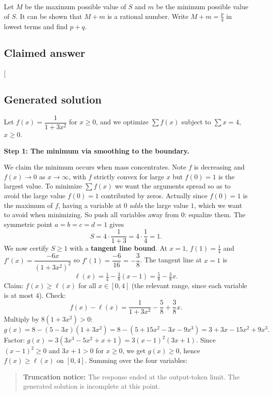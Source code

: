 \documentclass[
  11pt,
  letterpaper,
]{article}
\begin{document}
Let \(M\) be the maximum possible value of \(S\) and \(m\) be the
minimum possible value of \(S\). It can be shown that \(M+m\) is a
rational number. Write \(M+m=\frac{p}{q}\) in lowest terms and find
\(p+q\).

\subsection{Claimed answer}\label{claimed-answer-18}

{[}\boxed{34}{]}

\subsection{Generated solution}\label{generated-solution-18}

Let \(f(x)=\dfrac{1}{1+3x^2}\) for \(x\ge 0\), and we optimize
\(\sum f(x)\) subject to \(\sum x=4\), \(x\ge0\).

\textbf{Step 1: The minimum via smoothing to the boundary.}

We claim the minimum occurs when mass concentrates. Note \(f\) is
decreasing and \(f(x)\to 0\) as \(x\to\infty\), with \(f\) strictly
convex for large \(x\) but \(f(0)=1\) is the largest value. To minimize
\(\sum f(x)\) we want the arguments spread so as to avoid the large
value \(f(0)=1\) contributed by zeros. Actually since \(f(0)=1\) is the
maximum of \(f\), having a variable at \(0\) \emph{adds} the large value
\(1\), which we want to avoid when minimizing. So push all variables
away from \(0\): equalize them. The symmetric point \(a=b=c=d=1\) gives
\[
S=4\cdot\frac{1}{1+3}=4\cdot\frac14=1.
\] We now certify \(S\ge 1\) with a \textbf{tangent line bound}. At
\(x=1\), \(f(1)=\tfrac14\) and \(f'(x)=\dfrac{-6x}{(1+3x^2)^2}\) so
\(f'(1)=\dfrac{-6}{16}=-\dfrac38\). The tangent line at \(x=1\) is \[
\ell(x)=\tfrac14-\tfrac38(x-1)=\tfrac58-\tfrac38 x.
\] Claim: \(f(x)\ge \ell(x)\) for all \(x\in[0,4]\) (the relevant range,
since each variable is at most \(4\)). Check: \[
f(x)-\ell(x)=\frac{1}{1+3x^2}-\frac58+\frac38 x.
\] Multiply by \(8(1+3x^2)>0\): \[
g(x)=8-(5-3x)(1+3x^2)=8-(5+15x^2-3x-9x^3)=3+3x-15x^2+9x^3.
\] Factor: \(g(x)=3(3x^3-5x^2+x+1)=3(x-1)^2(3x+1)\). Since
\((x-1)^2\ge0\) and \(3x+1>0\) for \(x\ge0\), we get \(g(x)\ge0\), hence
\(f(x)\ge\ell(x)\) on \([0,4]\). Summing over the four variables:

\begin{quote}
\textbf{Truncation notice:} The response ended at the output-token
limit. The generated solution is incomplete at this point.
\end{quote}
\end{document}
